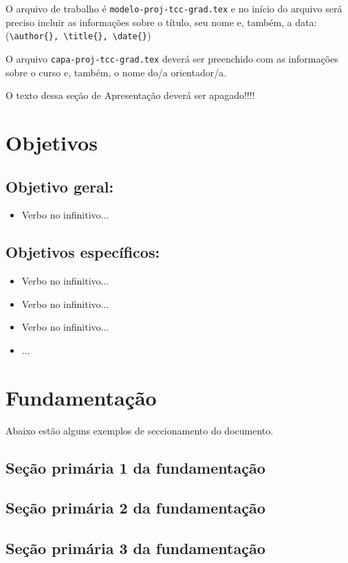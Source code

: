 \documentclass[a4paper,12pt,oneside,extrafontsizes]{memoir}
\begin{document}
 O arquivo de trabalho é \verb|modelo-proj-tcc-grad.tex| e no início do arquivo será preciso incluir as informações sobre o título, seu nome e, também, a data: (\verb|\author{}, \title{}, \date{}|) 

 O arquivo \verb|capa-proj-tcc-grad.tex| deverá ser preenchido com as informações sobre o curso e, também, o nome do/a orientador/a.

 O texto dessa seção de Apresentação deverá ser apagado!!!!


\chapter{Objetivos}
\section{Objetivo geral:}
\begin{itemize}
\item Verbo no infinitivo...
\end{itemize}

\section{Objetivos específicos:}
\begin{itemize}
\item Verbo no infinitivo...
\item Verbo no infinitivo...
\item Verbo no infinitivo...
\item  ...
\end{itemize}

\chapter{Fundamentação}
Abaixo estão alguns exemplos de seccionamento do documento.

\section{Seção primária 1 da fundamentação}

\section{Seção primária 2 da fundamentação}

\section{Seção primária 3 da fundamentação}
\end{document}
